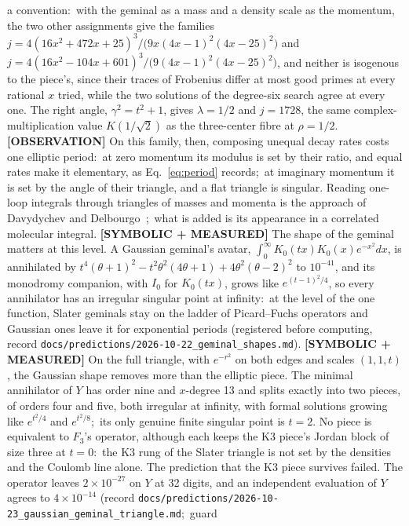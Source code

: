 \documentclass[aps,pra,twocolumn,superscriptaddress,longbibliography]{revtex4-2}
\begin{document}
a convention:\ with the geminal as a mass and a density scale as the
momentum, the two other assignments give the families
$j=4(16x^2+472x+25)^3/\bigl(9x(4x-1)^2(4x-25)^2\bigr)$ and
$j=4(16x^2-104x+601)^3/\bigl(9(4x-1)^2(4x-25)^2\bigr)$, and neither is
isogenous to the piece's, since their traces of Frobenius differ at most
good primes at every rational $x$ tried, while the two solutions of the
degree-six search agree at every one.  The right angle,
$\gamma^2=t^2+1$, gives $\lambda=1/2$ and $j=1728$, the same
complex-multiplication value $K(1/\sqrt2)$ as the three-center fibre at
$\rho=1/2$.  \textbf{[OBSERVATION]} On this family, then, composing
unequal decay rates costs one elliptic period:\ at zero momentum its
modulus is set by their ratio, and equal rates make it elementary, as
Eq.~\eqref{eq:period} records;\ at imaginary momentum it is set by the
angle of their triangle, and a flat triangle is singular.  Reading
one-loop integrals through triangles of masses and momenta is the
approach of Davydychev and Delbourgo~\cite{davydychev_delbourgo1998};\
what is added is its appearance in a correlated molecular integral.
\textbf{[SYMBOLIC + MEASURED]} The shape of the geminal matters at this
level.  A Gaussian geminal's avatar, $\int_0^\infty K_0(tx)K_0(x)e^{-x^2}dx$,
is annihilated by $t^4(\theta+1)^2-t^2\theta^2(4\theta+1)+4\theta^2(\theta-2)^2$
to $10^{-41}$, and its monodromy companion, with $I_0$ for $K_0(tx)$, grows
like $e^{(t-1)^2/4}$, so every annihilator has an irregular singular point
at infinity:\ at the level of the one function, Slater geminals stay on the
ladder of Picard--Fuchs operators and Gaussian ones leave it for exponential
periods (registered before computing, record
\texttt{docs/predictions/2026-10-22\_geminal\_shapes.md}).
\textbf{[SYMBOLIC + MEASURED]} On the full triangle, with $e^{-r^2}$ on
both edges and scales $(1,1,t)$, the Gaussian shape removes more than the
elliptic piece.  The minimal annihilator of $Y$ has order nine and
$x$-degree 13 and splits exactly into two pieces, of orders four and five,
both irregular at infinity, with formal solutions growing like
$e^{t^2/4}$ and $e^{t^2/8}$;\ its only genuine finite singular point is
$t=2$.  No piece is equivalent to $F_3$'s operator, although each keeps
the K3 piece's Jordan block of size three at $t=0$:\ the K3 rung of the
Slater triangle is not set by the densities and the Coulomb line alone.
The prediction that the K3 piece survives failed.  The operator leaves
$2\times10^{-27}$ on $Y$ at 32 digits, and an independent evaluation of
$Y$ agrees to $4\times10^{-14}$ (record
\texttt{docs/predictions/2026-10-23\_gaussian\_geminal\_triangle.md};\ guard
\end{document}
